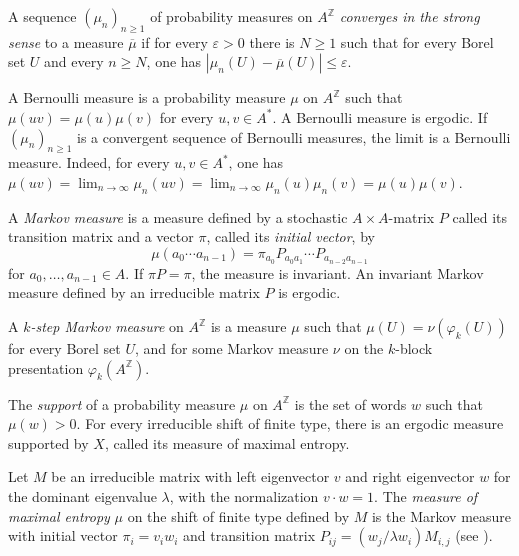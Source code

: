 \documentclass{article}[11pt]
\newcommand{\Z}{\mathbb{Z}}
\numberwithin{theorem}{section}
\numberwithin{equation}{section}
\numberwithin{figure}{section}
\numberwithin{table}{section}
\begin{document}
A sequence $(\mu_n)_{n\ge 1}$ of probability measures on $A^\Z$ \emph{converges in the
strong sense} to a measure $\overline{\mu}$ if for every $\varepsilon>0$ there is $N\ge 1$
such that for every Borel set $U$ and every $n\ge N$, one has
$|\mu_n(U)-\overline{\mu}(U)|\le\varepsilon$.



A Bernoulli measure is a probability measure $\mu$ on $A^\Z$
such that $\mu(uv)=\mu(u)\mu(v)$ for every $u,v\in A^*$.
A Bernoulli measure is ergodic. If $(\mu_n)_{n\ge 1}$
is a convergent sequence of Bernoulli measures, the limit
is a Bernoulli measure. Indeed, for every $u,v\in A^*$,
one has $\mu(uv)=\lim_{n\to\infty}\mu_n(uv)=\lim_{n\to\infty}\mu_n(u)\mu_n(v)=\mu(u)\mu(v)$.

A \emph{Markov measure} is a measure defined by a stochastic $A\times A$-matrix $P$ 
called its {transition matrix} and a vector $\pi$, called its \emph{initial vector},
by 
\[\mu(a_0\cdots a_{n-1})=\pi_{a_0}P_{a_0a_1}\cdots P_{a_{n-2}a_{n-1}}\]
for $a_0,\ldots,a_{n-1}\in A$.
If $\pi P=\pi$, the measure is invariant. An invariant  Markov measure defined by
an irreducible matrix $P$ is ergodic.

A \emph{$k$-step Markov measure} on $A^\Z$ is a measure $\mu$ such that $\mu(U)=\nu(\varphi_k(U))$
for every Borel set $U$, and
for some Markov measure $\nu$ on the $k$-block presentation $\varphi_k(A^\Z)$.

The \emph{support} of a probability measure $\mu$ on $A^\Z$ is the set of words $w$
such that $\mu(w)>0$.
For every irreducible shift of finite type,
there is an ergodic measure supported by $X$, called
its measure of maximal entropy. 

Let $M$ be an irreducible matrix with left eigenvector $v$ and right eigenvector $w$
for the dominant eigenvalue $\lambda$, with the normalization $v\cdot w=1$.
The \emph{measure of maximal entropy} $\mu$ 
on the shift of finite type defined by  $M$ is the Markov measure with initial vector $\pi_i=v_iw_i$
and transition matrix $P_{ij}=(w_j/\lambda w_i)M_{i,j}$ (see \cite[chapter 13]{LindMarcus1995}). 
\end{document}
